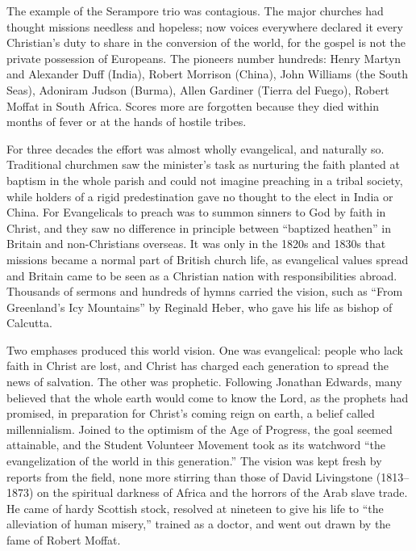 The example of the Serampore trio was contagious. The major churches had thought missions needless
and hopeless; now voices everywhere declared it every Christian's duty to share in the conversion of
the world, for the gospel is not the private possession of Europeans. The pioneers number hundreds:
Henry Martyn and Alexander Duff (India), Robert Morrison (China), John Williams (the South Seas), Adoniram Judson (Burma), Allen Gardiner (Tierra del Fuego), Robert Moffat in South Africa. Scores
more are forgotten because they died within months of fever or at the hands of hostile tribes.

For three decades the effort was almost wholly evangelical, and naturally so. Traditional churchmen
saw the minister's task as nurturing the faith planted at baptism in the whole parish and could not
imagine preaching in a tribal society, while holders of a rigid predestination gave no thought to the
elect in India or China. For Evangelicals to preach was to summon sinners to God by faith in Christ, and they saw no difference in principle between ``baptized heathen'' in Britain and non-Christians
overseas. It was only in the 1820s and 1830s that missions became a normal part of British church life, as evangelical values spread and Britain came to be seen as a Christian nation with responsibilities abroad. Thousands of sermons and hundreds of hymns carried the vision, such as
``From Greenland's Icy Mountains'' by Reginald Heber, who gave his life as bishop of Calcutta.

Two emphases produced this world vision. One was evangelical: people who lack faith in Christ are lost, and Christ has charged each generation to spread the news of salvation. The other was prophetic.
Following Jonathan Edwards, many believed that the whole earth would come to know the Lord, as the prophets had promised, in preparation for Christ's coming reign on earth, a belief called
millennialism. Joined to the optimism of the Age of Progress, the goal seemed attainable, and the
Student Volunteer Movement took as its watchword ``the evangelization of the world in this
generation.'' The vision was kept fresh by reports from the field, none more stirring than those of
David Livingstone (1813--1873) on the spiritual darkness of Africa and the horrors of the Arab slave
trade. He came of hardy Scottish stock, resolved at nineteen to give his life to ``the alleviation
of human misery,'' trained as a doctor, and went out drawn by the fame of Robert Moffat.

